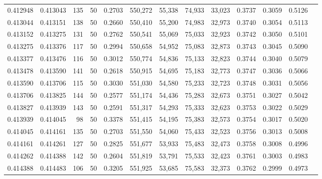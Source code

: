 \begin{tabular}{rrrrrrrrrrrrr}
0.412948 & 0.413043 &   135 &  50 &                                     0.2703 & 550,272 &  55,338 &  74,933 &  33,023 & 0.3737 & 0.3059 & 0.5126 \\
0.413044 & 0.413151 &   138 &  50 &                                     0.2660 & 550,410 &  55,200 &  74,983 &  32,973 & 0.3740 & 0.3054 & 0.5113 \\
0.413152 & 0.413275 &   131 &  50 &                                     0.2762 & 550,541 &  55,069 &  75,033 &  32,923 & 0.3742 & 0.3050 & 0.5101 \\
0.413275 & 0.413376 &   117 &  50 &                                     0.2994 & 550,658 &  54,952 &  75,083 &  32,873 & 0.3743 & 0.3045 & 0.5090 \\
0.413377 & 0.413476 &   116 &  50 &                                     0.3012 & 550,774 &  54,836 &  75,133 &  32,823 & 0.3744 & 0.3040 & 0.5079 \\
0.413478 & 0.413590 &   141 &  50 &                                     0.2618 & 550,915 &  54,695 &  75,183 &  32,773 & 0.3747 & 0.3036 & 0.5066 \\
0.413590 & 0.413706 &   115 &  50 &                                     0.3030 & 551,030 &  54,580 &  75,233 &  32,723 & 0.3748 & 0.3031 & 0.5056 \\
0.413706 & 0.413825 &   144 &  50 &                                     0.2577 & 551,174 &  54,436 &  75,283 &  32,673 & 0.3751 & 0.3027 & 0.5042 \\
0.413827 & 0.413939 &   143 &  50 &                                     0.2591 & 551,317 &  54,293 &  75,333 &  32,623 & 0.3753 & 0.3022 & 0.5029 \\
0.413939 & 0.414045 &    98 &  50 &                                     0.3378 & 551,415 &  54,195 &  75,383 &  32,573 & 0.3754 & 0.3017 & 0.5020 \\
0.414045 & 0.414161 &   135 &  50 &                                     0.2703 & 551,550 &  54,060 &  75,433 &  32,523 & 0.3756 & 0.3013 & 0.5008 \\
0.414161 & 0.414261 &   127 &  50 &                                     0.2825 & 551,677 &  53,933 &  75,483 &  32,473 & 0.3758 & 0.3008 & 0.4996 \\
0.414262 & 0.414388 &   142 &  50 &                                     0.2604 & 551,819 &  53,791 &  75,533 &  32,423 & 0.3761 & 0.3003 & 0.4983 \\
0.414388 & 0.414483 &   106 &  50 &                                     0.3205 & 551,925 &  53,685 &  75,583 &  32,373 & 0.3762 & 0.2999 & 0.4973 \\

\end{tabular}
